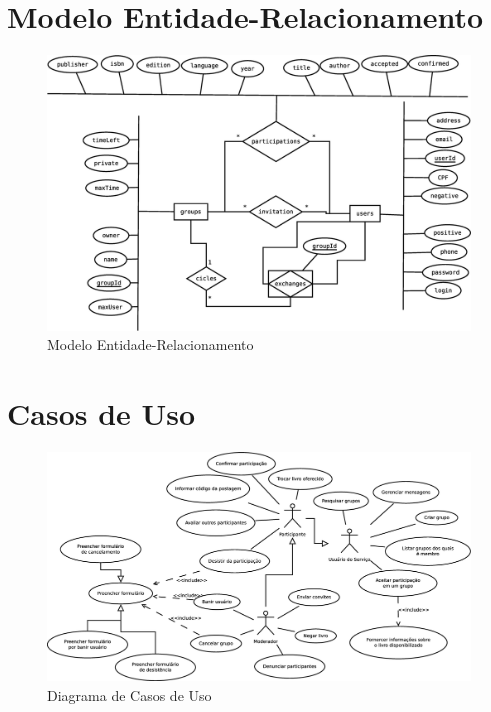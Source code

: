 \documentclass[a4paper]{article}
\begin{document}
\section{Modelo Entidade-Relacionamento}
 \begin{figure}[H]
  \includegraphics[angle=90,totalheight=0.8\textheight]{modeloER.eps}
  \caption{Modelo Entidade-Relacionamento}
 \end{figure}
 
\section{Casos de Uso}
 \begin{figure}[H]
  \includegraphics[angle=90,totalheight=0.9\textheight]{casosDeUso.eps}
  \caption{Diagrama de Casos de Uso}
 \end{figure}
 
\end{document}
